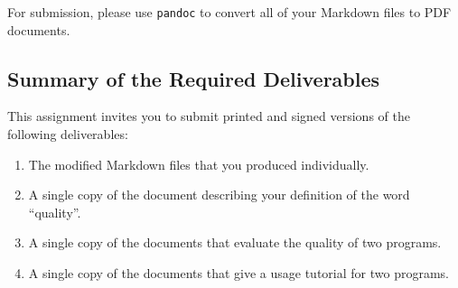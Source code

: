 For submission, please use {\tt pandoc} to convert all of your Markdown files to PDF documents.

\subsection*{Summary of the Required Deliverables}

This assignment invites you to submit printed and signed versions of the following deliverables:

\vspace*{-.1in}
\begin{enumerate}
  \setlength{\itemsep}{0in}
  \item The modified Markdown files that you produced individually.
  \item A single copy of the document describing your definition of the word ``quality''.
  \item A single copy of the documents that evaluate the quality of two programs.
  \item A single copy of the documents that give a usage tutorial for two programs.
\end{enumerate}
\vspace*{-.1in}



